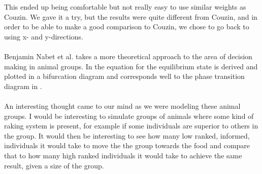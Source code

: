 This ended up being comfortable but not really easy to use similar weights as Couzin. 
We gave it a try, but the results were quite different from Couzin, and in order to be able to make a good comparison to Couzin, we chose to go back to using x- and y-directions.
\\\\
Benjamin Nabet et al. takes a more theoretical approach to the area of decision making in animal groups. 
In \cite{anArticle} the equation for the equilibrium state is derived and plotted in a bifurcation diagram and corresponds well to the phase transition diagram in \cite{theArticle}.
\\\\
An interesting thought came to our mind as we were modeling these animal groups. I would be interesting to simulate groups of animals where some kind of raking system is present, for example if some individuals are superior to others in the group. It would then be interesting to see how many low ranked, informed, individuals it would take to move the the group towards the food and compare that to how many high ranked individuals it would take to achieve the same result, given a size of the group.